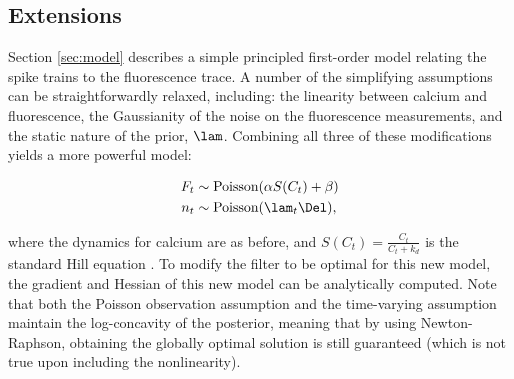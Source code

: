\subsection{Extensions}

Section \ref{sec:model} describes a simple principled first-order model relating the spike trains to the fluorescence trace. A number of the simplifying assumptions can be straightforwardly relaxed, including: the linearity between calcium and fluorescence, the Gaussianity of the noise on the fluorescence measurements, and the static nature of the prior, $\lam$.  Combining all three of these modifications yields a more powerful model:


\begin{align}
	F_t &\sim \text{Poisson}(\alpha S(C_t) + \beta) \label{eq:nonlin} \\
	n_t &\sim \text{Poisson}(\lam_t \Del),
\end{align}

\noindent where the dynamics for calcium are as before, and $S(C_t)=\frac{C_t}{C_t + k_d}$ is the standard Hill equation \cite{PologrutoSvoboda04}.  To modify the \foopsi filter to be optimal for this new model, the gradient and Hessian of this new model can be analytically computed.  Note that both the Poisson observation assumption and the time-varying assumption maintain the log-concavity of the posterior, meaning that by using Newton-Raphson, obtaining the globally optimal solution is still guaranteed (which is not true upon including the nonlinearity).   


